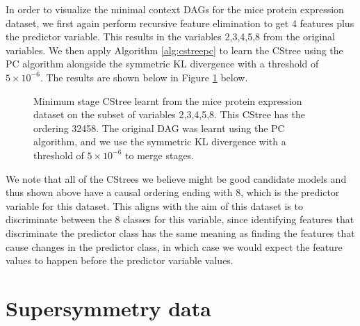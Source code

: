 \documentclass{tufte-book}
\begin{document}
In order to visualize the minimal context DAGs for the mice protein expression dataset, we first again perform recursive feature elimination to get 4 features plus the predictor variable. This results in the variables 2,3,4,5,8 from the original variables. We then apply Algorithm \ref{alg:cstreepc} to learn the CStree using the PC algorithm alongside the symmetric KL divergence with a threshold of \(5 \times 10^{-6}\). The results are shown below in Figure  \ref{fig:mice_mcdags} below.
\begin{figure}[!h]\label{fig:mice_mcdags}
   \begin{floatrow}
%
\caption{Minimum stage CStree learnt from the mice protein expression dataset on the subset of variables 2,3,4,5,8. This CStree has the ordering 32458. The original DAG was learnt using the PC algorithm, and we use the symmetric KL divergence with a threshold of $5\times 10^{-6}$ to merge stages.}
        
   \end{floatrow}
\end{figure}

We note that  all of the CStrees we believe might be good candidate models and thus shown above have a causal ordering ending with 8, which is the predictor variable for this dataset. This aligns with the aim of this dataset is to discriminate between the 8 classes for this variable, since identifying features that discriminate the predictor class has the same meaning as finding the features that cause changes in the predictor class, in which case we would expect the feature values to happen before the predictor variable values.



\section{Supersymmetry data}
\label{sec:org3351282}
\end{document}

